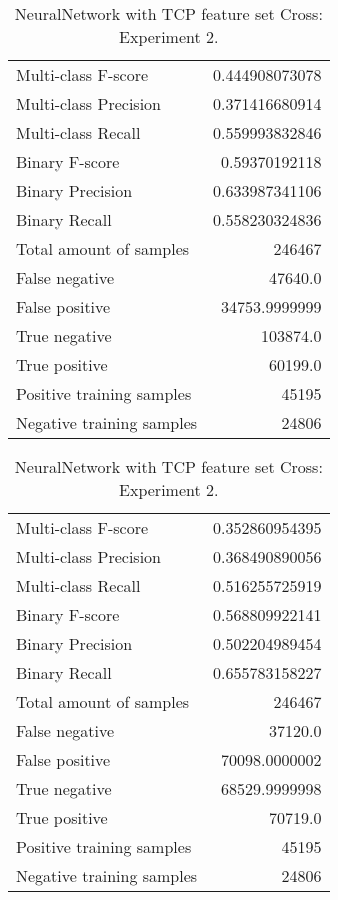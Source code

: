 \begin{table}[H]
\begin{minipage}{0.5\textwidth}
\caption{NeuralNetwork with TCP feature set Cross: \\Experiment 1.}
\centering
\begin{tabular}{l r}
\toprule
Multi-class F-score & 0.444908073078 \\
Multi-class Precision & 0.371416680914 \\
Multi-class Recall & 0.559993832846 \\
\midrule
Binary F-score & 0.59370192118 \\
Binary Precision & 0.633987341106 \\
Binary Recall & 0.558230324836 \\
\midrule
Total amount of samples & 246467 \\
False negative & 47640.0 \\
False positive & 34753.9999999 \\
True negative & 103874.0 \\
True positive & 60199.0 \\
\midrule
Positive training samples & 45195 \\
Negative training samples & 24806 \\
\bottomrule
\end{tabular}
\end{minipage}
\hfillx
\begin{minipage}{0.5\textwidth}
\caption{NeuralNetwork with TCP feature set Cross: \\Experiment 2.}
\centering
\begin{tabular}{l r}
\toprule
Multi-class F-score & 0.352860954395 \\
Multi-class Precision & 0.368490890056 \\
Multi-class Recall & 0.516255725919 \\
\midrule
Binary F-score & 0.568809922141 \\
Binary Precision & 0.502204989454 \\
Binary Recall & 0.655783158227 \\
\midrule
Total amount of samples & 246467 \\
False negative & 37120.0 \\
False positive & 70098.0000002 \\
True negative & 68529.9999998 \\
True positive & 70719.0 \\
\midrule
Positive training samples & 45195 \\
Negative training samples & 24806 \\
\bottomrule
\end{tabular}
\end{minipage}
\end{table}
